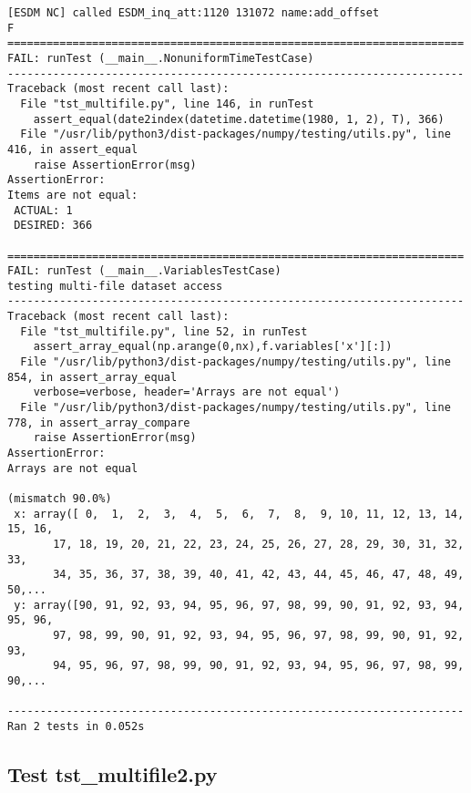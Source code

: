\begin{verbatim}
[ESDM NC] called ESDM_inq_att:1120 131072 name:add_offset
F
======================================================================
FAIL: runTest (__main__.NonuniformTimeTestCase)
----------------------------------------------------------------------
Traceback (most recent call last):
  File "tst_multifile.py", line 146, in runTest
    assert_equal(date2index(datetime.datetime(1980, 1, 2), T), 366)
  File "/usr/lib/python3/dist-packages/numpy/testing/utils.py", line 416, in assert_equal
    raise AssertionError(msg)
AssertionError:
Items are not equal:
 ACTUAL: 1
 DESIRED: 366

======================================================================
FAIL: runTest (__main__.VariablesTestCase)
testing multi-file dataset access
----------------------------------------------------------------------
Traceback (most recent call last):
  File "tst_multifile.py", line 52, in runTest
    assert_array_equal(np.arange(0,nx),f.variables['x'][:])
  File "/usr/lib/python3/dist-packages/numpy/testing/utils.py", line 854, in assert_array_equal
    verbose=verbose, header='Arrays are not equal')
  File "/usr/lib/python3/dist-packages/numpy/testing/utils.py", line 778, in assert_array_compare
    raise AssertionError(msg)
AssertionError:
Arrays are not equal

(mismatch 90.0%)
 x: array([ 0,  1,  2,  3,  4,  5,  6,  7,  8,  9, 10, 11, 12, 13, 14, 15, 16,
       17, 18, 19, 20, 21, 22, 23, 24, 25, 26, 27, 28, 29, 30, 31, 32, 33,
       34, 35, 36, 37, 38, 39, 40, 41, 42, 43, 44, 45, 46, 47, 48, 49, 50,...
 y: array([90, 91, 92, 93, 94, 95, 96, 97, 98, 99, 90, 91, 92, 93, 94, 95, 96,
       97, 98, 99, 90, 91, 92, 93, 94, 95, 96, 97, 98, 99, 90, 91, 92, 93,
       94, 95, 96, 97, 98, 99, 90, 91, 92, 93, 94, 95, 96, 97, 98, 99, 90,...

----------------------------------------------------------------------
Ran 2 tests in 0.052s
\end{verbatim}

\subsection{Test tst\_multifile2.py}

